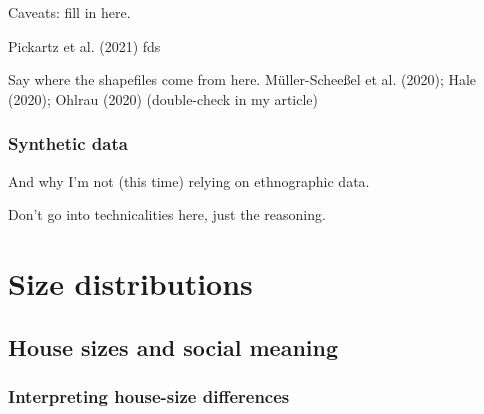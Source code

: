 \documentclass[
  12pt,
]{book}
\begin{document}
Caveats: fill in here.

Pickartz et al. (2021) fds

Say where the shapefiles come from here. Müller-Scheeßel et al. (2020); Hale (2020); Ohlrau (2020) (double-check in my article)

\hypertarget{synthetic-data}{%
\section{Synthetic data}\label{synthetic-data}}

And why I'm not (this time) relying on ethnographic data.

Don't go into technicalities here, just the reasoning.

\hypertarget{part-size-distributions}{%
\part{Size distributions}\label{part-size-distributions}}

\hypertarget{house-sizes-theory}{%
\chapter{House sizes and social meaning}\label{house-sizes-theory}}

\hypertarget{house-sizes-ethno}{%
\section{Interpreting house-size differences}\label{house-sizes-ethno}}
\end{document}
